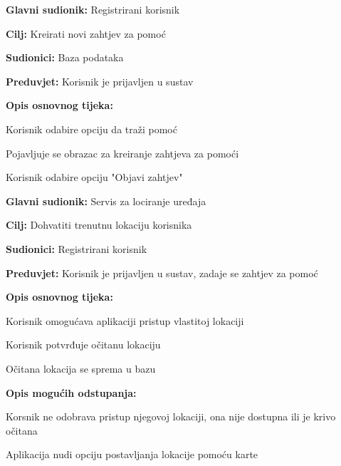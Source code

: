 \noindent {}
\begin{packed_item}
	\item \textbf{Glavni sudionik: } Registrirani korisnik
	\item  \textbf{Cilj:} Kreirati novi zahtjev za pomoć
	\item  \textbf{Sudionici:} Baza podataka
	\item  \textbf{Preduvjet:} Korisnik je prijavljen u sustav
	\item  \textbf{Opis osnovnog tijeka:}
	
	\item[] \begin{packed_enum}
		
		\item Korisnik odabire opciju da traži pomoć
		\item Pojavljuje se obrazac za kreiranje zahtjeva za pomoći
		\item Korisnik odabire opciju "Objavi zahtjev"
	\end{packed_enum}
\end{packed_item}
\noindent {}
\begin{packed_item}
	\item \textbf{Glavni sudionik: } Servis za lociranje uređaja
	\item  \textbf{Cilj:} Dohvatiti trenutnu lokaciju korisnika
	\item  \textbf{Sudionici:} Registrirani korisnik
	\item  \textbf{Preduvjet:} Korisnik je prijavljen u sustav, zadaje se zahtjev za pomoć
	\item  \textbf{Opis osnovnog tijeka:}
	
	\item[] \begin{packed_enum}
		
		\item Korisnik omogućava aplikaciji pristup vlastitoj lokaciji
		\item Korisnik potvrđuje očitanu lokaciju
		\item Očitana lokacija se sprema u bazu
	\end{packed_enum}
	\item  \textbf{Opis mogućih odstupanja:}
	
	\item[] \begin{packed_item}
		
		\item[1.a] Korsnik ne odobrava pristup njegovoj lokaciji, ona nije dostupna ili je krivo očitana
		\item[] \begin{packed_enum}
			
			\item Aplikacija nudi opciju postavljanja lokacije pomoću karte
			
		\end{packed_enum}
	\end{packed_item}
\end{packed_item}
